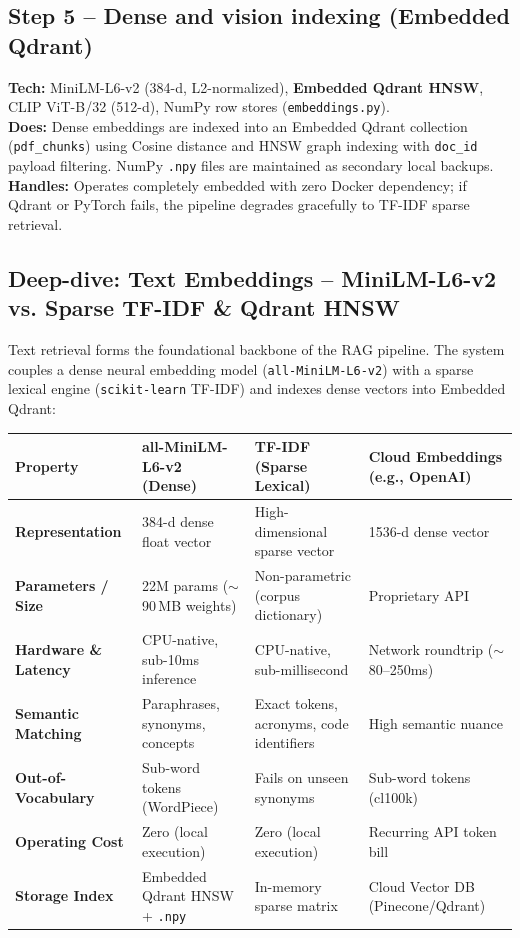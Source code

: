 \documentclass[11pt,a4paper]{article}
\begin{document}
\subsection{Step 5 -- Dense and vision indexing (Embedded Qdrant)}
\textbf{Tech:} MiniLM-L6-v2 (384-d, L2-normalized), \textbf{Embedded Qdrant HNSW}, CLIP ViT-B/32 (512-d), NumPy row stores (\texttt{embeddings.py}).\\
\textbf{Does:} Dense embeddings are indexed into an Embedded Qdrant collection (\texttt{pdf\_chunks}) using Cosine distance and HNSW graph indexing with \texttt{doc\_id} payload filtering. NumPy \texttt{.npy} files are maintained as secondary local backups.\\
\textbf{Handles:} Operates completely embedded with zero Docker dependency; if Qdrant or PyTorch fails, the pipeline degrades gracefully to TF-IDF sparse retrieval.

\subsection{Deep-dive: Text Embeddings -- MiniLM-L6-v2 vs. Sparse TF-IDF \& Qdrant HNSW}
Text retrieval forms the foundational backbone of the RAG pipeline. The system couples a dense neural embedding model (\texttt{all-MiniLM-L6-v2}) with a sparse lexical engine (\texttt{scikit-learn} TF-IDF) and indexes dense vectors into Embedded Qdrant:

{\footnotesize
\begin{center}
\begin{tabular}{@{}lp{3.6cm}p{4.0cm}p{3.8cm}@{}}
\toprule
Property & \textbf{all-MiniLM-L6-v2} (Dense) & \textbf{TF-IDF} (Sparse Lexical) & \textbf{Cloud Embeddings} (e.g., OpenAI) \\
\midrule
\textbf{Representation} & 384-d dense float vector & High-dimensional sparse vector & 1536-d dense vector \\
\textbf{Parameters / Size} & 22M params ($\sim$90\,MB weights) & Non-parametric (corpus dictionary) & Proprietary API \\
\textbf{Hardware \& Latency} & CPU-native, sub-10ms inference & CPU-native, sub-millisecond & Network roundtrip ($\sim$80--250ms) \\
\textbf{Semantic Matching} & Paraphrases, synonyms, concepts & Exact tokens, acronyms, code identifiers & High semantic nuance \\
\textbf{Out-of-Vocabulary} & Sub-word tokens (WordPiece) & Fails on unseen synonyms & Sub-word tokens (cl100k) \\
\textbf{Operating Cost} & Zero (local execution) & Zero (local execution) & Recurring API token bill \\
\textbf{Storage Index} & Embedded Qdrant HNSW + \texttt{.npy} & In-memory sparse matrix & Cloud Vector DB (Pinecone/Qdrant) \\
\bottomrule
\end{tabular}
\end{center}
}
\end{document}
